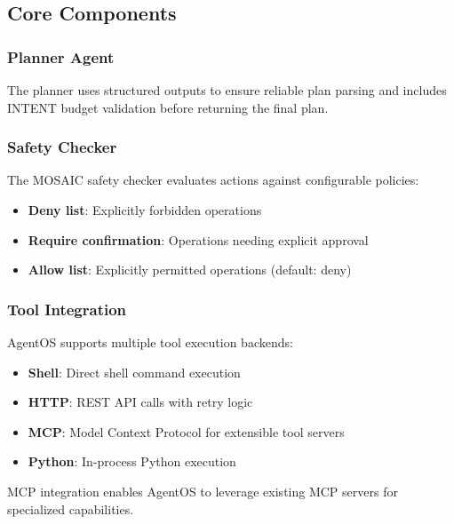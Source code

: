 \documentclass[12pt,a4paper]{article}
\begin{document}
\subsection{Core Components}

\subsubsection{Planner Agent}



The planner uses structured outputs to ensure reliable plan parsing and includes INTENT budget validation before returning the final plan.

\subsubsection{Safety Checker}

The MOSAIC safety checker evaluates actions against configurable policies:

\begin{itemize}
    \item \textbf{Deny list}: Explicitly forbidden operations
    \item \textbf{Require confirmation}: Operations needing explicit approval
    \item \textbf{Allow list}: Explicitly permitted operations (default: deny)
\end{itemize}

\subsubsection{Tool Integration}

AgentOS supports multiple tool execution backends:
\begin{itemize}
    \item \textbf{Shell}: Direct shell command execution
    \item \textbf{HTTP}: REST API calls with retry logic
    \item \textbf{MCP}: Model Context Protocol for extensible tool servers
    \item \textbf{Python}: In-process Python execution
\end{itemize}

MCP integration enables AgentOS to leverage existing MCP servers for specialized capabilities.
\end{document}
